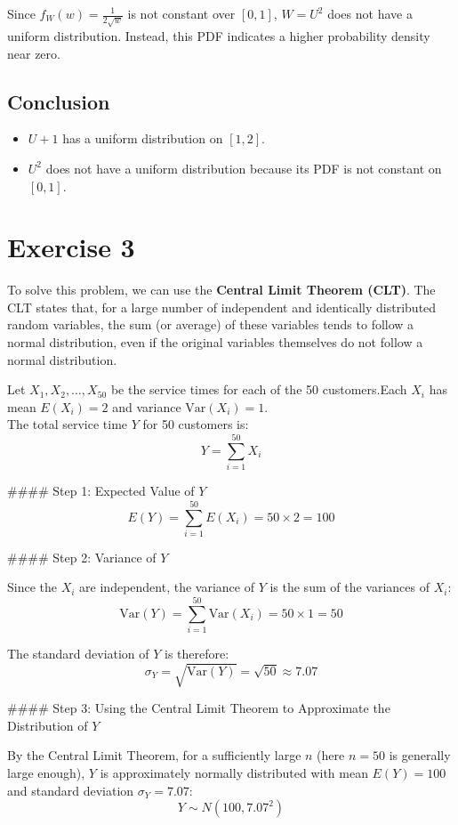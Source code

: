 \documentclass[a4paper,12pt]{article}
\begin{document}
   Since \( f_W(w) = \frac{1}{2\sqrt{w}} \) is not constant over \( [0, 1] \), \( W = U^2 \) does not have a uniform distribution. Instead, this PDF indicates a higher probability density near zero.
\subsection*{Conclusion}
\begin{itemize}
    \item \( U + 1 \) has a uniform distribution on \( [1, 2] \).
    \item \( U^2 \) does not have a uniform distribution because its PDF is not constant on \( [0, 1] \).
\end{itemize}
\newpage

\section{Exercise 3}
To solve this problem, we can use the \textbf{Central Limit Theorem (CLT)}. The CLT states that, for a large number of independent and identically distributed random variables, the sum (or average) of these variables tends to follow a normal distribution, even if the original variables themselves do not follow a normal distribution.


Let \( X_1, X_2, \ldots, X_{50} \) be the service times for each of the 50 customers.Each \( X_i \) has mean \( E(X_i) = 2 \) and variance \( \text{Var}(X_i) = 1 \).
\\The total service time \( Y \) for 50 customers is:
  \[
  Y = \sum_{i=1}^{50} X_i
  \]

#### Step 1: Expected Value of \( Y \)
\[
E(Y) = \sum_{i=1}^{50} E(X_i) = 50 \times 2 = 100
\]

#### Step 2: Variance of \( Y \)

Since the \( X_i \) are independent, the variance of \( Y \) is the sum of the variances of \( X_i \):
\[
\text{Var}(Y) = \sum_{i=1}^{50} \text{Var}(X_i) = 50 \times 1 = 50
\]

The standard deviation of \( Y \) is therefore:
\[
\sigma_Y = \sqrt{\text{Var}(Y)} = \sqrt{50} \approx 7.07
\]

#### Step 3: Using the Central Limit Theorem to Approximate the Distribution of \( Y \)

By the Central Limit Theorem, for a sufficiently large \( n \) (here \( n = 50 \) is generally large enough), \( Y \) is approximately normally distributed with mean \( E(Y) = 100 \) and standard deviation \( \sigma_Y = 7.07 \):
\[
Y \sim N(100, 7.07^2)
\]
\end{document}

